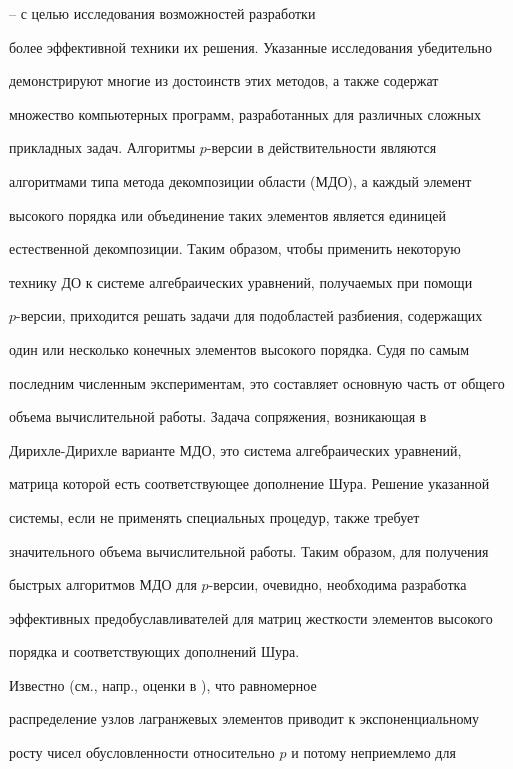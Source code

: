 \cite{amon}--\cite{mandel} с целью исследования возможностей разработки


более эффективной техники их решения. Указанные исследования убедительно


демонстрируют многие из достоинств этих методов, а также содержат


множество компьютерных программ, разработанных для различных сложных


прикладных задач. Алгоритмы $p$-версии в действительности являются


алгоритмами типа метода декомпозиции области (МДО), а каждый элемент


высокого порядка или объединение таких элементов является единицей


естественной декомпозиции. Таким образом, чтобы применить некоторую


технику ДО к системе алгебраических уравнений, получаемых при помощи


$p$-версии, приходится решать задачи для подобластей разбиения, содержащих


один или несколько конечных элементов высокого порядка. Судя по самым


последним численным экспериментам, это составляет основную часть от общего


объема вычислительной работы. Задача сопряжения, возникающая в


Дирихле-Дирихле варианте МДО, это система алгебраических уравнений,


матрица которой есть соответствующее дополнение Шура. Решение указанной


системы, если не применять специальных процедур, также требует


значительного объема вычислительной работы. Таким образом, для получения


быстрых алгоритмов МДО для $p$-версии, очевидно, необходима разработка


эффективных предобуславливателей для матриц жесткости элементов высокого


порядка и соответствующих дополнений Шура.





Известно (см., напр., оценки в \cite{iva-kor1}), что равномерное


распределение узлов лагранжевых элементов приводит к экспоненциальному


росту чисел обусловленности относительно $p$ и потому неприемлемо для


